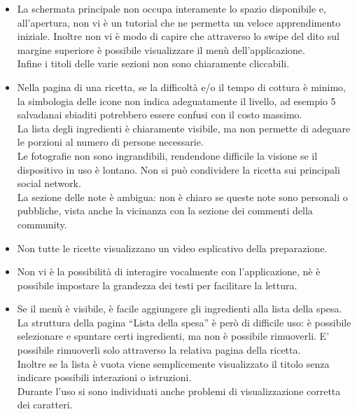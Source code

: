 \begin{itemize}
\item La schermata principale non occupa interamente lo spazio disponibile e, all'apertura, non vi è un tutorial che ne permetta un veloce apprendimento iniziale. Inoltre non vi è modo di capire che attraverso lo swipe del dito sul margine superiore è possibile visualizzare il menù dell'applicazione.\\ Infine i titoli delle varie sezioni non sono chiaramente cliccabili.

\item Nella pagina di una ricetta, se la difficoltà e/o il tempo di cottura è minimo, la simbologia delle icone non indica adeguatamente il livello, ad esempio 5 salvadanai sbiaditi potrebbero essere confusi con il costo massimo.\\
La lista degli ingredienti è chiaramente visibile, ma non permette di adeguare le porzioni al numero di persone necessarie.\\
Le fotografie non sono ingrandibili, rendendone difficile la visione se il dispositivo in uso è lontano. Non si può condividere la ricetta sui principali social network.\\La sezione delle note è ambigua: non è chiaro se queste note sono personali o pubbliche, vista anche la vicinanza con la sezione dei commenti della community.

\item Non tutte le ricette visualizzano un video esplicativo della preparazione.

\item Non vi è la possibilità di interagire vocalmente con l'applicazione, nè è possibile impostare la grandezza dei testi per facilitare la lettura.

\item Se il menù è visibile, è facile aggiungere gli ingredienti alla lista della spesa. La struttura della pagina ``Lista della spesa'' è però di difficile uso: è possibile selezionare e spuntare certi ingredienti, ma non è possibile rimuoverli. E' possibile rimuoverli solo attraverso la relativa pagina della ricetta.\\Inoltre se la lista è vuota viene semplicemente visualizzato il titolo senza indicare possibili interazioni o istruzioni.\\
Durante l'uso si sono individuati anche problemi di visualizzazione corretta dei caratteri.


\end{itemize}
